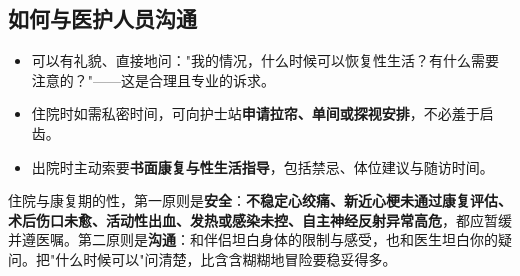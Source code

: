 \subsection{如何与医护人员沟通}

\begin{itemize}
	\item 可以有礼貌、直接地问："我的情况，什么时候可以恢复性生活？有什么需要注意的？"——这是合理且专业的诉求。
	\item 住院时如需私密时间，可向护士站\textbf{申请拉帘、单间或探视安排}，不必羞于启齿。
	\item 出院时主动索要\textbf{书面康复与性生活指导}，包括禁忌、体位建议与随访时间。
\end{itemize}

\begin{tcolorbox}[colback=yellow!5!white,colframe=orange!60!black,title=贴心小叮咛]
住院与康复期的性，第一原则是\textbf{安全}：\textbf{不稳定心绞痛、新近心梗未通过康复评估、术后伤口未愈、活动性出血、发热或感染未控、自主神经反射异常高危}，都应暂缓并遵医嘱。第二原则是\textbf{沟通}：和伴侣坦白身体的限制与感受，也和医生坦白你的疑问。把"什么时候可以"问清楚，比含含糊糊地冒险要稳妥得多。
\end{tcolorbox}
